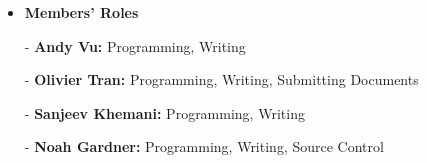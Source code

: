 \documentclass[12pt]{article}
\begin{document}
\begin{itemize}
    \item \textbf{Members' Roles}
    \item[-] \textbf{Andy Vu:} Programming, Writing
    \item[-] \textbf{Olivier Tran:} Programming, Writing, Submitting Documents
    \item[-] \textbf{Sanjeev Khemani:} Programming, Writing
    \item[-] \textbf{Noah Gardner:} Programming, Writing, Source Control
\end{itemize}



\end{document}
